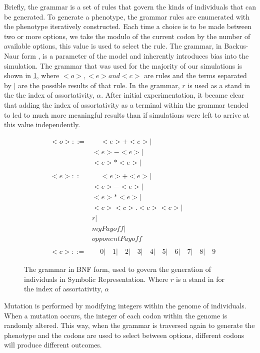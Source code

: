 \documentclass[11pt]{book}
\newcommand*{\np}{\par\noindent\newline}
\begin{document}
\np Briefly, the grammar is a set of rules that govern the kinds of individuals that can be generated.
To generate a phenotype, the grammar rules are enumerated with the phenotype iteratively constructed.
Each time a choice is to be made between two or more options, we take the modulo of the current codon by the number of available options, this value is used to select the rule.
The grammar, in Backus-Naur form \citep{oneill_grammatical_2001}, is a parameter of the model and inherently introduces bias into the simulation.
The grammar that was used for the majority of our simulations is shown in \ref{grammar}, where $<o>, <e> and <c>$ are rules and the terms separated by $|$ are the possible results of that rule.
In the grammar, $r$ is used as a stand in the the index of assortativity, $\alpha$.
After initial experimentation, it became clear that adding the index of assortativity as a terminal within the grammar
tended to led to much more meaningful results than if simulations were left to arrive at this value independently.
\begin{figure}[]
	\centering
	\begin{align*}
		&<o> ::= \qquad <e>+<e>|\\
		& \qquad \qquad \qquad <e>-<e>| \nonumber \\
		& \qquad \qquad \qquad <e>*<e>| \nonumber \\ \nonumber \\
		&<e> ::= \qquad <e>+<e>| \nonumber \\
		&\qquad \qquad \qquad <e>-<e>| \nonumber \\
		&\qquad \qquad \qquad <e>*<e>| \nonumber \\
		&\qquad \qquad \qquad <c><c>.<c><c>| \nonumber \\
		&\qquad \qquad \qquad r| \nonumber \\
		&\qquad \qquad \qquad myPayoff| \nonumber \\
		&\qquad \qquad \qquad opponentPayoff \nonumber \\ \nonumber \\
		&<c>  ::= \qquad 0 | \quad 1 |\quad 2 |\quad 3 |\quad 4 |\quad 5 |\quad 6 |\quad 7 |\quad 8 |\quad 9 \nonumber
	\end{align*}
\caption{The grammar in BNF form, used to govern the generation of individuals in Symbolic Representation. Where $r$ is a stand in for the index of assortativity, $\alpha$}
\label{grammar}
\end{figure}


\np Mutation is performed by modifying integers within the genome of individuals.
When a mutation occurs, the integer of each codon within the genome is randomly altered.
This way, when the grammar is traversed again to generate the phenotype and the codons are used to select between options, different codons will produce different outcomes.
\end{document}
